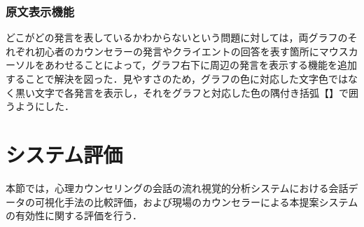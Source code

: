 \documentclass[shuuron]{kuee}
\begin{document}

\subsubsection{原文表示機能}

どこがどの発言を表しているかわからないという問題に対しては，両グラフのそれぞれ初心者のカウンセラーの発言やクライエントの回答を表す箇所にマウスカーソルをあわせることによって，グラフ右下に周辺の発言を表示する機能を追加することで解決を図った．見やすさのため，グラフの色に対応した文字色ではなく黒い文字で各発言を表示し，それをグラフと対応した色の隅付き括弧【】で囲うようにした．





%
%



\section{システム評価}%



本節では，心理カウンセリングの会話の流れ視覚的分析システムにおける会話データの可視化手法の比較評価，および現場のカウンセラーによる本提案システムの有効性に関する評価を行う．%
%
%
%
%
%
%
\end{document}
